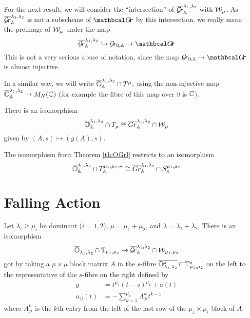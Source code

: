 \documentclass[draft]{article}
\begin{document}
For the next result, we will consider the ``intersection'' of $ \overline{\mathcal{G}\!r}^{\lambda_1, \lambda_2}_\mathbb A $ with $\mathcal W_\mu$.  As $  \overline{\mathcal{G}\!r}^{\lambda_1, \lambda_2}_\mathbb A $ is not a subscheme of $ \Grth$ by this intersection, we really mean the preimage of $ \mathcal W_\mu$ under the map $$ \overline{\Gr}^{\lambda_1, \lambda_2}_\AA  \hookrightarrow \Grbd \rightarrow \Grth$$
This is not a very serious abuse of notation, since the map $ \Grbd \rightarrow \Grth $ is almost injective.

In a similar way, we will write $ \overline{\mathbb O}^{\lambda_1, \lambda_2}_\mathbb A \cap T^\mu$, using the non-injective map $ \overline{\mathbb O}^{\lambda_1, \lambda_2}_\mathbb A \rightarrow M_N(\mathbb C)$ (for example the fibre of this map over $ 0 $ is $ \mathbb C $).

\begin{theorem} \label{th:OGrl}
    There is an isomorphism
    $$\overline{\mathbb O}^{\lambda_1, \lambda_2}_\mathbb A \cap T_\mu \cong \overline{Gr}^{\lambda_1, \lambda_2}_\mathbb A \cap \mathcal W_\mu $$
    given by $ (A,s) \mapsto (g(A), s)$.
\end{theorem}

\begin{theorem}
    The isomorphism from Theorem \ref{th:OGrl} restricts to an isomorphism
    $$ \overline{\mathbb O}^{\lambda_1, \lambda_2}_\mathbb A \cap T^{\mu_1, \mu_2, +}_\mathbb A \cong \overline{Gr}^{\lambda_1, \lambda_2}_\mathbb A \cap S^{\mu_1, \mu_2}_\mathbb A$$
\end{theorem}


\section{Falling Action} %

\begin{theorem}
    Let $\lambda_i\ge\mu_i$ be dominant ($i=1,2$), $\mu = \mu_1 +\mu_2$, and $\lambda =\lambda_1+\lambda_2$. 
    There is an isomorphism 
    \begin{equation}
        \overline{\mathbb O}_{\lambda_1,\lambda_2}\cap\mathbb T_{\mu_1,\mu_2} \to \overline{\mathcal{G}\!r}_\mathbb A^{\lambda_1,\lambda_2}\cap \mathcal W_{\mu_1,\mu_2}
    \end{equation}
    got by taking a $\mu\times\mu$ block matrix $A$ in the $s$-fibre $\overline{\mathbb O_{\lambda_1,\lambda_2}^s}\cap\mathbb T_{\mu_1,\mu_2}^s$ on the left to the representative of the $s$-fibre on the right defined by  
    \begin{equation}
        \begin{split}
            g &= t^{\mu_1} (t-s)^{\mu_2} + a(t) \\
            a_{ij}(t) &= - \sum_{k=1}^{\mu_i} A^k_{ji} t^{k-1}
        \end{split}
    \end{equation}
    where $A^k_{ji}$ is the $k$th entry from the left of the last row of the $\mu_j\times\mu_i$ block of $A$. 
\end{theorem}
\end{document}
